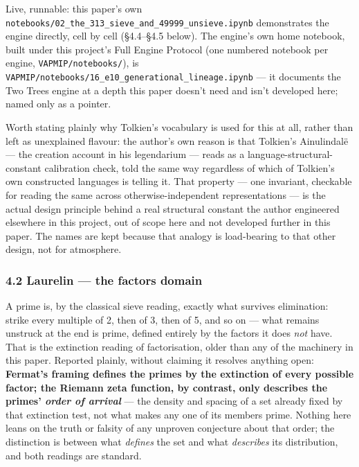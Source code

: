 \documentclass[
  10pt,
]{article}
\begin{document}
Live, runnable: this paper's own
\texttt{notebooks/02\_the\_313\_sieve\_and\_49999\_unsieve.ipynb}
demonstrates the engine directly, cell by cell (§4.4--§4.5 below). The
engine's own home notebook, built under this project's Full Engine
Protocol (one numbered notebook per engine, \texttt{VAPMIP/notebooks/}),
is \texttt{VAPMIP/notebooks/16\_e10\_generational\_lineage.ipynb} --- it
documents the Two Trees engine at a depth this paper doesn't need and
isn't developed here; named only as a pointer.

Worth stating plainly why Tolkien's vocabulary is used for this at all,
rather than left as unexplained flavour: the author's own reason is that
Tolkien's Ainulindalë --- the creation account in his legendarium ---
reads as a language-structural-constant calibration check, told the same
way regardless of which of Tolkien's own constructed languages is
telling it. That property --- one invariant, checkable for reading the
same across otherwise-independent representations --- is the actual
design principle behind a real structural constant the author engineered
elsewhere in this project, out of scope here and not developed further
in this paper. The names are kept because that analogy is load-bearing
to that other design, not for atmosphere.

\hypertarget{laurelin-the-factors-domain}{%
\subsubsection{4.2 Laurelin --- the factors
domain}\label{laurelin-the-factors-domain}}

A prime is, by the classical sieve reading, exactly what survives
elimination: strike every multiple of 2, then of 3, then of 5, and so on
--- what remains unstruck at the end is prime, defined entirely by the
factors it does \emph{not} have. That is the extinction reading of
factorisation, older than any of the machinery in this paper. Reported
plainly, without claiming it resolves anything open: \textbf{Fermat's
framing defines the primes by the extinction of every possible factor;
the Riemann zeta function, by contrast, only describes the primes'
\emph{order of arrival}} --- the density and spacing of a set already
fixed by that extinction test, not what makes any one of its members
prime. Nothing here leans on the truth or falsity of any unproven
conjecture about that order; the distinction is between what
\emph{defines} the set and what \emph{describes} its distribution, and
both readings are standard.
\end{document}
